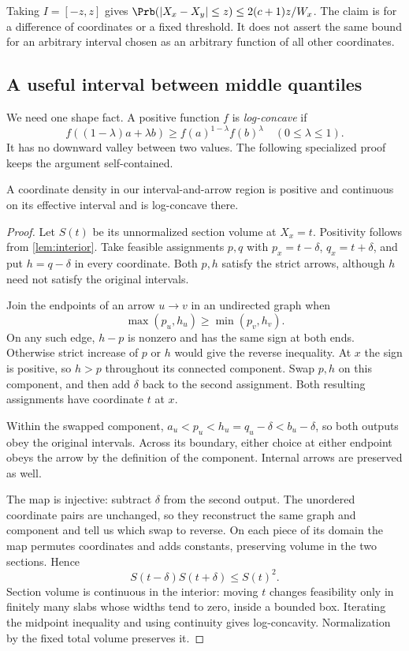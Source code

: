 Taking $I=[-z,z]$ gives $\Prb(|X_x-X_y|\le z)\le2(c+1)z/W_x$. The claim is for a difference of coordinates or a fixed threshold. It does not assert the same bound for an arbitrary interval chosen as an arbitrary function of all other coordinates.

\subsection{A useful interval between middle quantiles}

We need one shape fact. A positive function $f$ is \emph{log-concave} if
\[
f((1-\lambda)a+\lambda b)\ge f(a)^{1-\lambda}f(b)^\lambda
\quad(0\le\lambda\le1).
\]
It has no downward valley between two values. The following specialized proof keeps the argument self-contained.

\begin{lemma}\label{lem:shape}
A coordinate density in our interval-and-arrow region is positive and continuous on its effective interval and is log-concave there.
\end{lemma}
\begin{proof}
Let $S(t)$ be its unnormalized section volume at $X_x=t$. Positivity follows from \cref{lem:interior}. Take feasible assignments $p,q$ with $p_x=t-\delta$, $q_x=t+\delta$, and put $h=q-\delta$ in every coordinate. Both $p,h$ satisfy the strict arrows, although $h$ need not satisfy the original intervals.

Join the endpoints of an arrow $u\to v$ in an undirected graph when
\[
\max(p_u,h_u)\ge\min(p_v,h_v).
\]
On any such edge, $h-p$ is nonzero and has the same sign at both ends. Otherwise strict increase of $p$ or $h$ would give the reverse inequality. At $x$ the sign is positive, so $h>p$ throughout its connected component. Swap $p,h$ on this component, and then add $\delta$ back to the second assignment. Both resulting assignments have coordinate $t$ at $x$.

Within the swapped component, $a_u<p_u<h_u=q_u-\delta<b_u-\delta$, so both outputs obey the original intervals. Across its boundary, either choice at either endpoint obeys the arrow by the definition of the component. Internal arrows are preserved as well.

The map is injective: subtract $\delta$ from the second output. The unordered coordinate pairs are unchanged, so they reconstruct the same graph and component and tell us which swap to reverse. On each piece of its domain the map permutes coordinates and adds constants, preserving volume in the two sections. Hence
\[
S(t-\delta)S(t+\delta)\le S(t)^2.
\]
Section volume is continuous in the interior: moving $t$ changes feasibility only in finitely many slabs whose widths tend to zero, inside a bounded box. Iterating the midpoint inequality and using continuity gives log-concavity. Normalization by the fixed total volume preserves it.
\end{proof}

